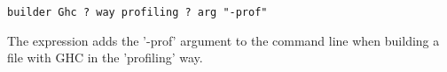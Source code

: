 \begin{lstlisting}
builder Ghc ? way profiling ? arg "-prof"
\end{lstlisting}

\noindent The expression adds the \lst'-prof' argument to the command line when
building a file with GHC in the \lst'profiling' way.

\newcommand{\itab}[1]{\hspace{0em}\rlap{#1}}
\newcommand{\tab}[1]{\hspace{.1\textwidth}\rlap{#1}}
\newcommand{\ctab}[1]{\hspace{.031\textwidth}\rlap{#1}}
\newcommand{\ptab}[1]{\hspace{.074\textwidth}\rlap{#1}}
\newcommand{\cotab}[1]{\hspace{.064\textwidth}\rlap{#1}}
\newcommand{\ttab}[1]{\hspace{.058\textwidth}\rlap{#1}}
\newcommand{\tytab}[1]{\hspace{.06\textwidth}\rlap{#1}}
\newcommand{\atab}[1]{\hspace{.102\textwidth}\rlap{#1}}

